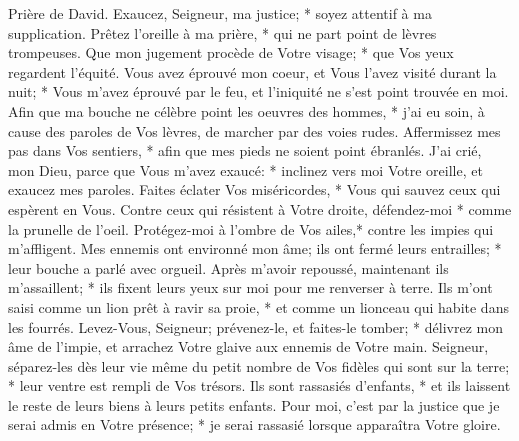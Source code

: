 Prière de David. Exaucez, Seigneur, ma justice; * soyez attentif à ma supplication. Prêtez l'oreille à ma prière, * qui ne part point de lèvres trompeuses.
Que mon jugement procède de Votre visage; * que Vos yeux regardent l'équité.
Vous avez éprouvé mon coeur, et Vous l'avez visité durant la nuit; * Vous m'avez éprouvé par le feu, et l'iniquité ne s'est point trouvée en moi.
Afin que ma bouche ne célèbre point les oeuvres des hommes, * j'ai eu soin, à cause des paroles de Vos lèvres, de marcher par des voies rudes.
Affermissez mes pas dans Vos sentiers, * afin que mes pieds ne soient point ébranlés.
J'ai crié, mon Dieu, parce que Vous m'avez exaucé: * inclinez vers moi Votre oreille, et exaucez mes paroles.
Faites éclater Vos miséricordes, * Vous qui sauvez ceux qui espèrent en Vous.
Contre ceux qui résistent à Votre droite, défendez-moi * comme la prunelle de l'oeil. Protégez-moi à l'ombre de Vos ailes,*
contre les impies qui m'affligent. Mes ennemis ont environné mon âme;
ils ont fermé leurs entrailles; * leur bouche a parlé avec orgueil.
Après m'avoir repoussé, maintenant ils m'assaillent; * ils fixent leurs yeux sur moi pour me renverser à terre.
Ils m'ont saisi comme un lion prêt à ravir sa proie, * et comme un lionceau qui habite dans les fourrés.
Levez-Vous, Seigneur; prévenez-le, et faites-le tomber; * délivrez mon âme de l'impie, et arrachez Votre glaive
aux ennemis de Votre main. Seigneur, séparez-les dès leur vie même du petit nombre de Vos fidèles qui sont sur la terre; * leur ventre est rempli de Vos trésors. Ils sont rassasiés d'enfants, * et ils laissent le reste de leurs biens à leurs petits enfants.
Pour moi, c'est par la justice que je serai admis en Votre présence; * je serai rassasié lorsque apparaîtra Votre gloire.

